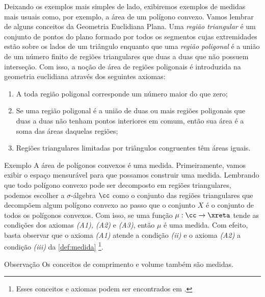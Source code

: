 Deixando os exemplos mais simples de lado, exibiremos exemplos de medidas mais usuais como, por exemplo, a área de um polígono convexo.
Vamos lembrar de alguns conceitos da Geometria Euclidiana Plana.
Uma \textit{região triangular}
 é um conjunto de pontos do plano formado por todos os segmentos cujas extremidades estão
sobre os lados de um triângulo enquanto que uma \textit{região poligonal} 
é a união de um número finito de regiões triangulares que duas a duas que não possuem interseção.
Com isso, a noção de área de regiões poligonais é introduzida na geometria euclidiana através dos seguintes axiomas:
\begin{enumerate}[label*=(\textit{A\arabic*})]
	\item A toda região poligonal corresponde um número
	maior do que zero;
	\item Se uma região poligonal é a união de duas ou mais
	regiões poligonais que duas a duas não tenham pontos interiores em
	comum, então sua área é a soma das áreas daquelas regiões;
	\item Regiões triangulares limitadas por triângulos congruentes têm áreas iguais.
\end{enumerate}
\begin{env}{Exemplo}
	\label{ex:area-como-medida}
	A área de polígonos convexos é uma medida.
	Primeiramente, vamos exibir o espaço mensurável para que possamos construir uma medida.
	Lembrando que todo polígono convexo pode ser decomposto em regiões triangulares, podemos escolher
 	a $\sigma$-álgebra $\cc$ como o conjunto das regiões triangulares que decompõem algum polígono convexo ao passo que o conjunto $X$ é o conjunto de todos os polígonos convexos. 
	Com isso, se uma função $\mu: \cc \to \xreta$ tende as condições dos axiomas \textit{(A1), (A2)} e \textit{(A3)}, então
	$\mu$ é uma medida.
	Com efeito, basta observar que o axioma \textit{(A1)} atende a condição \textit{(ii)} e o axioma \textit{(A2)} a condição \textit{(iii)} da \ref{def:medida}
	\footnote{
		Esses conceitos e axiomas podem ser encontrados em \cite[p.176]{lucas}.
		}.
\end{env}
\begin{env}{Observação}
	Os conceitos de comprimento e volume também são medidas.
\end{env}
